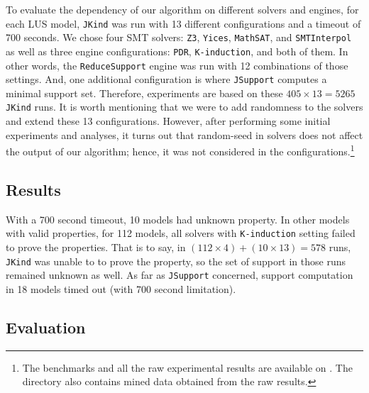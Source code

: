 To evaluate the dependency of our algorithm on different solvers and engines, for each LUS model, \texttt{JKind} was run with 13 different configurations and a timeout of 700 seconds. We chose four SMT solvers: \texttt{Z3}, \texttt{Yices}, \texttt{MathSAT}, and \texttt{SMTInterpol} as well as three engine configurations: \texttt{PDR},
\texttt{K-induction}, and both of them. In other words, the \texttt{ReduceSupport} engine was run with 12 combinations of those settings. And, one additional configuration is where \texttt{JSupport} computes a minimal support set. Therefore, experiments are based on these $405 \times 13 = 5265$ \texttt{JKind} runs. It is worth mentioning that we were to add randomness to the solvers and extend these 13 configurations. However, after performing some initial experiments and analyses, it turns out that random-seed in solvers does not affect the output of our algorithm; hence, it was not considered in the configurations.\footnote{The benchmarks and all the raw experimental results are available on \cite{expr}. The directory also contains mined data obtained from the raw results.}

\subsection{Results}

With a 700 second timeout, 10 models had unknown property. In other models with valid properties, for 112 models, all solvers with \texttt{K-induction} setting failed to prove the properties. That is to say, in $(112 \times 4) + (10 \times 13) = 578$ runs, \texttt{JKind} was unable to to prove the property, so the set of support in those runs remained unknown as well. As far as \texttt{JSupport} concerned, support computation in 18 models timed out (with 700 second limitation).

\subsection{Evaluation}
\label{subsec:eval}

